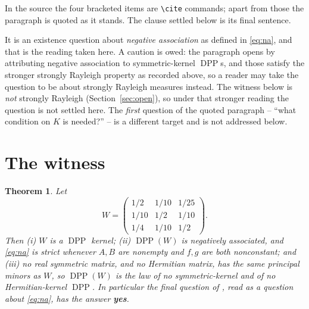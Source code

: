 \documentclass[11pt]{amsart}
\newtheorem{theorem}{Theorem}
\theoremstyle{remark}
\DeclareMathOperator{\DPP}{DPP}
\begin{document}
\noindent
In the source the four bracketed items are \verb|\cite| commands; apart from those the
paragraph is quoted as it stands. The clause settled below is its final sentence.

It is an existence question about \emph{negative association} as defined in \eqref{eq:na}, and
that is the reading taken here. A caution is owed: the paragraph opens by attributing negative
association to symmetric-kernel $\DPP$s, and those satisfy the stronger strongly Rayleigh
property as recorded above, so a reader may take the question to be about strongly Rayleigh
measures instead. The witness below is \emph{not} strongly Rayleigh
(Section~\ref{sec:open}), so under that stronger reading the question is not settled here. The
\emph{first} question of the quoted paragraph -- ``what condition on $K$ is needed?'' -- is a
different target and is not addressed below.

\section{The witness}\label{sec:witness}

\begin{theorem}\label{thm:main}
Let
\[
 W=\begin{pmatrix}
   1/2 & 1/10 & 1/25\\ 1/10 & 1/2 & 1/10\\ 1/4 & 1/10 & 1/2
  \end{pmatrix}.
\]
Then \emph{(i)} $W$ is a $\DPP$ kernel; \emph{(ii)} $\DPP(W)$ is negatively associated, and
\eqref{eq:na} is \emph{strict} whenever $A,B$ are nonempty and $f,g$ are both nonconstant; and
\emph{(iii)} no real symmetric matrix, and no
Hermitian matrix, has the same principal minors as $W$, so $\DPP(W)$ is the law of no
symmetric-kernel and of no Hermitian-kernel $\DPP$. In particular the final question of
\cite[\S{}Discussion and open problems, ``Negative association'']{Poinas}, read as a question
about \eqref{eq:na}, has the answer \textbf{yes}.
\end{theorem}
\end{document}
